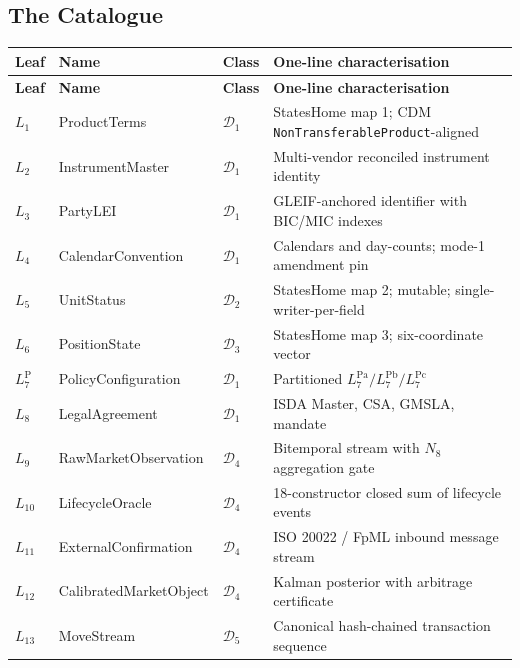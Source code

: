 \documentclass[11pt,a4paper]{article}
\begin{document}
\subsection{The Catalogue}
\label{sec:tax-catalogue}

\begin{center}
\begin{longtable}{p{2cm}p{4.5cm}p{1.6cm}p{6cm}}
\toprule
\textbf{Leaf} & \textbf{Name} & \textbf{Class} & \textbf{One-line characterisation} \\
\midrule
\endfirsthead
\toprule
\textbf{Leaf} & \textbf{Name} & \textbf{Class} & \textbf{One-line characterisation} \\
\midrule
\endhead
\bottomrule
\endfoot
$L_1$    & ProductTerms                & $\mathcal{D}_1$ & StatesHome map 1; CDM \texttt{NonTransferableProduct}-aligned \\
$L_2$    & InstrumentMaster            & $\mathcal{D}_1$ & Multi-vendor reconciled instrument identity \\
$L_3$    & PartyLEI                    & $\mathcal{D}_1$ & GLEIF-anchored identifier with BIC/MIC indexes \\
$L_4$    & CalendarConvention          & $\mathcal{D}_1$ & Calendars and day-counts; mode-1 amendment pin \\
$L_5$    & UnitStatus                  & $\mathcal{D}_2$ & StatesHome map 2; mutable; single-writer-per-field \\
$L_6$    & PositionState               & $\mathcal{D}_3$ & StatesHome map 3; six-coordinate vector \\
$L_7^{\mathrm{P}}$ & PolicyConfiguration & $\mathcal{D}_1$ & Partitioned $L_7^{\mathrm{Pa}} / L_7^{\mathrm{Pb}} / L_7^{\mathrm{Pc}}$ \\
$L_8$    & LegalAgreement              & $\mathcal{D}_1$ & ISDA Master, CSA, GMSLA, mandate \\
$L_9$    & RawMarketObservation        & $\mathcal{D}_4$ & Bitemporal stream with $N_8$ aggregation gate \\
$L_{10}$ & LifecycleOracle             & $\mathcal{D}_4$ & 18-constructor closed sum of lifecycle events \\
$L_{11}$ & ExternalConfirmation        & $\mathcal{D}_4$ & ISO 20022 / FpML inbound message stream \\
$L_{12}$ & CalibratedMarketObject      & $\mathcal{D}_4$ & Kalman posterior with arbitrage certificate \\
$L_{13}$ & MoveStream                  & $\mathcal{D}_5$ & Canonical hash-chained transaction sequence \\

\end{longtable}
\end{center}
\end{document}
